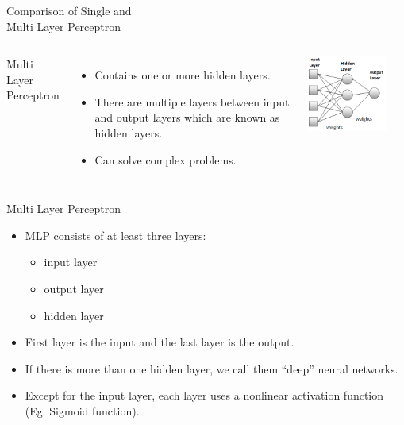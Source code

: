 \documentclass[aspectratio=169,13pt,usenames,dvipsnames]{beamer}
\begin{document}
\begin{frame}{ Comparison of Single and 
	\\ Multi Layer Perceptron }
\begin{columns}
\alert{Multi Layer Perceptron}
\begin{itemize}
  \item Contains one or more hidden layers.
  \item There are multiple layers between input and output layers which are known as hidden layers.
  \item Can solve complex problems.
\end{itemize}
\includegraphics[width=0.8\textwidth, height=0.6\textheight]{Images/AIML_MLP_IMG3.jpg}
\end{columns}
\end{frame}

\begin{frame}{Multi Layer Perceptron}
\begin{itemize}
\item MLP consists of at least three layers: \\
\begin{itemize} \item input layer
		\item  output layer
		\item  hidden layer
\end{itemize}
\item First layer is the input and the last layer is the output.
\item If there is more than one hidden layer, we call them “deep” neural networks.
\item Except for the input layer, each layer uses a nonlinear activation function (Eg. Sigmoid function).
\end{itemize}
\end{frame}
\end{document}
